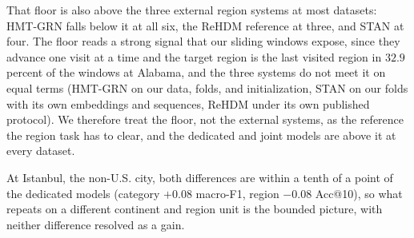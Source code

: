 That floor is also above the three external region systems at most datasets: HMT-GRN falls below
it at all six, the ReHDM reference at three, and STAN at four. The floor reads a strong signal that
our sliding windows expose, since they advance one visit at a time and the target region is the
last visited region in $32.9$ percent of the windows at Alabama, and the three systems do not meet
it on equal terms (HMT-GRN on our data, folds, and initialization, STAN on our folds with its own
embeddings and sequences, ReHDM under its own published protocol). We therefore treat the floor,
not the external systems, as the reference the region task has to clear, and the dedicated and
joint models are above it at every dataset.

At Istanbul, the non-U.S. city, both differences are within a tenth of a point of the dedicated
models (category $+0.08$ macro-F1, region $-0.08$ Acc@10), so what repeats on a different continent
and region unit is the bounded picture, with neither difference resolved as a gain.
